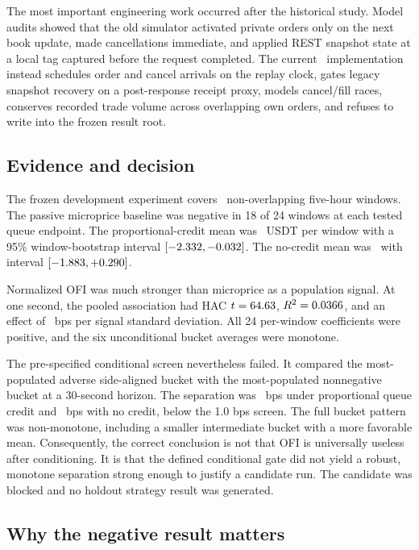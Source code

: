 The most important engineering work occurred after the historical study. Model
audits showed that the old simulator activated private orders only on the next
book update, made cancellations immediate, and applied REST snapshot state at a
local tag captured before the request completed. The current \CurrentModel\
implementation instead schedules order and cancel arrivals on the replay clock,
gates legacy snapshot recovery on a post-response receipt proxy, models
cancel/fill races, conserves recorded trade volume across overlapping own
orders, and refuses to write into the frozen result root.

\subsection{Evidence and decision}

The frozen development experiment covers \DevelopmentWindows\ non-overlapping
five-hour windows. The passive microprice baseline was negative in 18 of 24
windows at each tested queue endpoint. The proportional-credit mean was
\PhaseAQcOneMean\ USDT per window with a 95\% window-bootstrap interval
$[-2.332,-0.032]$. The no-credit mean was
\PhaseAQcZeroMean\ with interval
$[-1.883,+0.290]$.

Normalized OFI was much stronger than microprice as a population signal. At one
second, the pooled association had HAC $t=64.63$, $R^2=0.0366$, and
an effect of \OFIEffect\ bps per signal standard deviation. All 24 per-window
coefficients were positive, and the six unconditional bucket averages were
monotone.

The pre-specified conditional screen nevertheless failed. It compared the
most-populated adverse side-aligned bucket with the most-populated nonnegative
bucket at a 30-second horizon. The separation was
\OFIConditionalQcOne\ bps under proportional queue credit and
\OFIConditionalQcZero\ bps with no credit, below the 1.0 bps screen. The full
bucket pattern was non-monotone, including a smaller intermediate bucket with a
more favorable mean. Consequently, the correct conclusion is not that OFI is
universally useless after conditioning. It is that the defined conditional
gate did not yield a robust, monotone separation strong enough to justify a
candidate run. The \code{OFIGatedMM} candidate was blocked and no holdout
strategy result was generated.

\subsection{Why the negative result matters}

